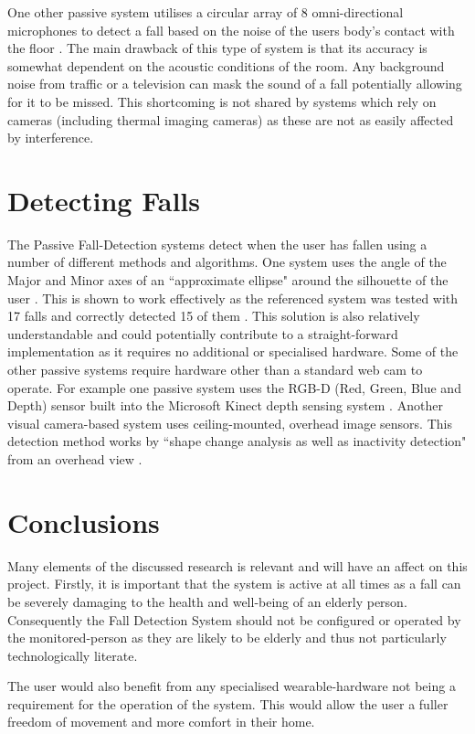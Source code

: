 \documentclass[11pt,a4paper]{report}
\begin{document}
One other passive system utilises a circular array of 8 omni-directional microphones to detect a fall based on the noise of the users body's contact with the floor \citep{Li_A_microphone_array}. The main drawback of this type of system is that its accuracy is somewhat dependent on the acoustic conditions of the room. Any background noise from traffic or a television can mask the sound of a fall potentially allowing for it to be missed. This shortcoming is not shared by systems which rely on cameras (including thermal imaging cameras) as these are not as easily affected by interference.

\section{Detecting Falls}
The Passive Fall-Detection systems detect when the user has fallen using a number of different methods and algorithms. One system uses the angle of the Major and Minor axes of an ``approximate ellipse" around the silhouette of the user \citep{rougier2007fall}. This is shown to work effectively as the referenced system was tested with 17 falls and correctly detected 15 of them \citep{rougier2007fall}. This solution is also relatively understandable and could potentially contribute to a straight-forward implementation as it requires no additional or specialised hardware. Some of the other passive systems require hardware other than a standard web cam to operate. For example one passive system uses the RGB-D (Red, Green, Blue and Depth) sensor built into the Microsoft Kinect depth sensing system \citep{kinectPassiveDetection}. Another visual camera-based system uses ceiling-mounted, overhead image sensors\citep{nait2004activity}. This detection method works by ``shape change analysis as well as inactivity detection" from an overhead view \citep{fallDetectionInvestigation}.

\section{Conclusions}
Many elements of the discussed research is relevant and will have an affect on this project. Firstly, it is important that the system is active at all times as a fall can be severely damaging to the health and well-being of an elderly person. Consequently the Fall Detection System should not be configured or operated by the monitored-person as they are likely to be elderly and thus not particularly technologically literate.

The user would also benefit from any specialised wearable-hardware not being a requirement for the operation of the system. This would allow the user a fuller freedom of movement and more comfort in their home.
\end{document}
